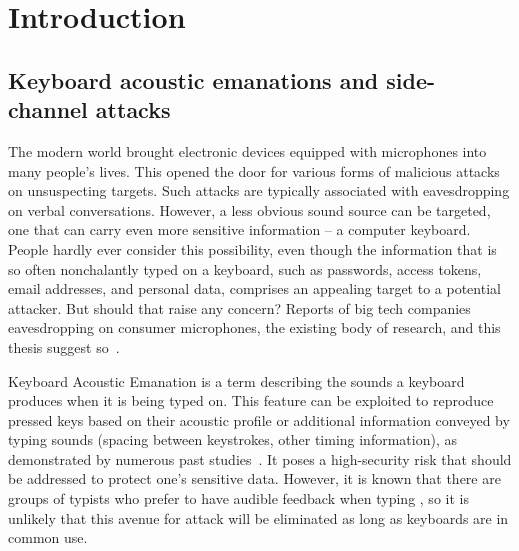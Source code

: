 \documentclass[../main.tex]{subfiles}
\begin{document}
\chapter{Introduction}
\label{cha:introduction}



\section{Keyboard acoustic emanations and side-channel attacks}
\label{sec:intro_keyboard_ac_emm}
The modern world brought electronic devices equipped with microphones into many people's lives. This opened the door for various forms of malicious attacks on unsuspecting targets. Such attacks are typically associated with eavesdropping on verbal conversations. However, a less obvious sound source can be targeted, one that can carry even more sensitive information -- a computer keyboard. People hardly ever consider this possibility, even though the information that is so often nonchalantly typed on a keyboard, such as passwords, access tokens, email addresses, and personal data, comprises an appealing target to a potential attacker. But should that raise any concern? Reports of big tech companies eavesdropping on consumer microphones, the existing body of research, and this thesis suggest so~\cite{bloomberg_alexa_listens, bloomberg_facebook_listens, google_eavesdropping}.

Keyboard Acoustic Emanation is a term describing the sounds a keyboard produces when it is being typed on. This feature can be exploited to reproduce pressed keys based on their acoustic profile or additional information conveyed by typing sounds (spacing between keystrokes, other timing information), as demonstrated by numerous past studies~\cite{survey2023}. It poses a high-security risk that should be addressed to protect one's sensitive data. However, it is known that there are groups of typists who prefer to have audible feedback when typing \cite{monty1983keyboard}, so it is unlikely that this avenue for attack will be eliminated as long as keyboards are in common use.
\end{document}
